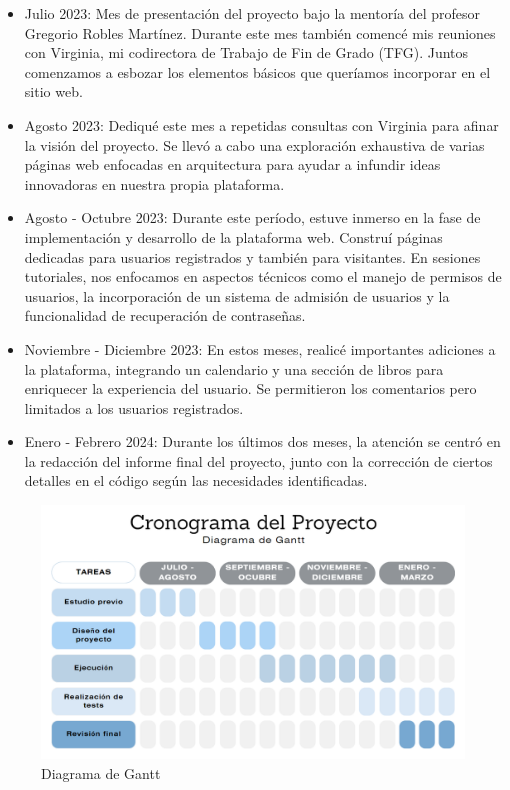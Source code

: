 \documentclass[a4paper, 12pt]{book}
\begin{document}
\begin{itemize}
  \item Julio 2023: Mes de presentación del proyecto bajo la mentoría del profesor Gregorio Robles Martínez.  Durante este mes también comencé mis reuniones con Virginia, mi codirectora de Trabajo de Fin de Grado (TFG). Juntos comenzamos a esbozar los elementos básicos que queríamos incorporar en el sitio web.
  \item Agosto 2023: Dediqué este mes a repetidas consultas con Virginia para afinar la visión del proyecto. Se llevó a cabo una exploración exhaustiva de varias páginas web enfocadas en arquitectura para ayudar a infundir ideas innovadoras en nuestra propia plataforma.
  \item Agosto - Octubre 2023: Durante este período, estuve inmerso en la fase de implementación y desarrollo de la plataforma web. Construí páginas dedicadas para usuarios registrados y también para visitantes. En sesiones tutoriales, nos enfocamos en aspectos técnicos como el manejo de permisos de usuarios, la incorporación de un sistema de admisión de usuarios y la funcionalidad de recuperación de contraseñas.
  \item Noviembre - Diciembre 2023: En estos meses, realicé importantes adiciones a la plataforma, integrando un calendario y una sección de libros para enriquecer la experiencia del usuario. Se permitieron los comentarios pero limitados a los usuarios registrados.
  \item Enero - Febrero 2024: Durante los últimos dos meses, la atención se centró en la redacción del informe final del proyecto, junto con la corrección de ciertos detalles en el código según las necesidades identificadas.
\end{itemize}

\begin{figure}
  \centering
  \includegraphics[width=15cm, keepaspectratio]{img/gann.png}
  \caption{Diagrama de Gantt}
  \label{fig:arquitectura}
\end{figure}
\end{document}
